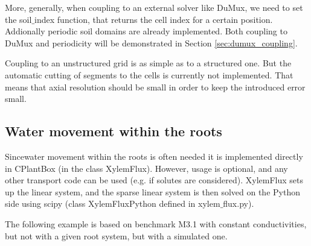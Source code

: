 More, generally, when coupling to an external solver like DuMux, we need to set the soil$\_$index function, that returns the cell index for a certain position. Addionally periodic soil domains are already implemented. Both coupling to DuMux and periodicity will be demonstrated in Section \ref{sec:dumux_coupling}.

Coupling to an unstructured grid is as simple as to a structured one. But the automatic cutting of segments to the cells is currently not implemented. That means that axial resolution should be small in order to keep the introduced error small.



\subsection{Water movement within the roots}

Sincewater movement within the roots is often needed it is implemented directly in CPlantBox (in the class XylemFlux). However, usage is optional, and any other transport code can be used (e.g. if solutes are considered). XylemFlux sets up the linear system, and the sparse linear system is then solved on the Python side using scipy (class XylemFluxPython defined in xylem$\_$flux.py).

The following example is based on benchmark M3.1 with constant conductivities, but not with a given root system, but with a simulated one.


